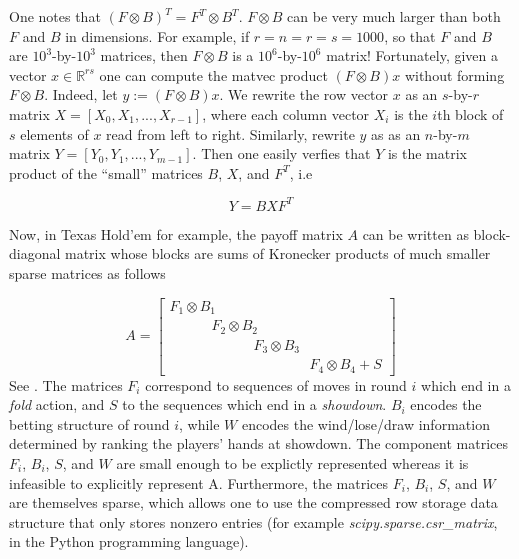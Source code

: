 \documentclass{article} %
\begin{document}
One notes that $(F \otimes B)^T = F^T \otimes B^T$.
$F \otimes B$ can be very much larger than both $F$ and $B$ in
dimensions. For example, if $r = n = r = s = 1000$, so that $F$ and
$B$ are $10^3$-by-$10^3$ matrices, then $F \otimes B$ is a
$10^6$-by-$10^6$ matrix! Fortunately, given a vector $x \in
\mathbb{R}^{rs}$ one can compute the matvec product $(F \otimes B)x$
without forming $F \otimes B$. Indeed, let $y := (F \otimes B)x$. We
rewrite the row vector $x$ as an $s$-by-$r$ matrix $X = [X_0, X_1,
  ..., X_{r-1}]$, where each column vector $X_i$ is the $i$th block of
$s$ elements of $x$ read from left to right. Similarly, rewrite $y$ as
as an $n$-by-$m$ matrix $Y = [Y_0, Y_1, ..., Y_{m-1}]$. Then one
easily verfies that $Y$ is the matrix product of the ``small''
matrices $B$, $X$, and $F^T$, i.e

\begin{equation}
  \label{eq:kron_matvec}
  Y = BXF^T
\end{equation}

Now, in Texas Hold'em for example, the payoff matrix $A$ can be
written as block-diagonal matrix whose blocks are sums of Kronecker
products of much smaller sparse matrices as follows

\begin{equation}
  A = \begin{bmatrix}F_1 \otimes B_1\hspace{10em}\\\hspace{3em}F_2
    \otimes B_2\hspace{7em}\\\hspace{6em}F_3 \otimes
    B_3\hspace{4em}\\\hspace{10em}F_4 \otimes B_4 + S \end{bmatrix}
\label{eq:factor_A}
\end{equation}
See \cite{hoda2010smoothing}. The matrices $F_i$ correspond to
sequences of moves in round $i$ which end in a \textit{fold} action,
and $S$ to the sequences which end in a \textit{showdown}. $B_i$
encodes the betting structure of round $i$, while $W$ encodes the
wind/lose/draw information determined by ranking the players' hands at
showdown. The component matrices $F_i$, $B_i$, $S$, and $W$ are small
enough to be explictly represented whereas it is infeasible to
explicitly represent A. Furthermore, the matrices $F_i$, $B_i$,
$S$, and $W$ are themselves sparse, which allows one to use the
compressed row storage data structure that only stores nonzero entries
(for example \textit{scipy.sparse.csr\_matrix}, in the Python
programming language).
\end{document}
